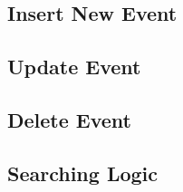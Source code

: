 \subsection{Insert New Event} %
\label{sub:insert_new_event}


\subsection{Update Event} %
\label{sub:update_event}


\subsection{Delete Event} %
\label{sub:delete_event}


\subsection{Searching Logic} %
\label{sub:searching_logic}



